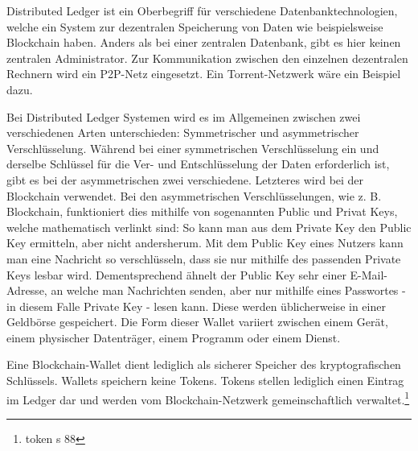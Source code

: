 Distributed Ledger ist ein Oberbegriff für verschiedene Datenbanktechnologien, welche ein System zur dezentralen Speicherung von Daten wie beispielsweise Blockchain haben. 
Anders als bei einer zentralen Datenbank, gibt es hier keinen zentralen Administrator. 
Zur Kommunikation zwischen den einzelnen dezentralen Rechnern wird ein P2P-Netz eingesetzt. 
Ein Torrent-Netzwerk wäre ein Beispiel dazu.

Bei Distributed Ledger Systemen wird es im Allgemeinen zwischen zwei verschiedenen Arten unterschieden: Symmetrischer und asymmetrischer Verschlüsselung. 
Während bei einer symmetrischen Verschlüsselung ein und derselbe Schlüssel für die Ver- und Entschlüsselung der Daten erforderlich ist, gibt es bei der asymmetrischen zwei verschiedene. 
Letzteres wird bei der Blockchain verwendet. 
Bei den asymmetrischen Verschlüsselungen, wie z. B. Blockchain, funktioniert dies mithilfe von sogenannten Public und Privat Keys, welche mathematisch verlinkt sind: So kann man aus dem Private Key den Public Key ermitteln, aber nicht andersherum. 
Mit dem Public Key eines Nutzers kann man eine Nachricht so verschlüsseln, dass sie nur mithilfe des passenden Private Keys lesbar wird. 
Dementsprechend ähnelt der Public Key sehr einer E-Mail-Adresse, an welche man Nachrichten senden, aber nur mithilfe eines Passwortes - in diesem Falle Private Key - lesen kann. Diese werden üblicherweise in einer Geldbörse gespeichert. 
Die Form dieser Wallet variiert zwischen einem Gerät, einem physischer Datenträger, einem Programm oder einem Dienst.

Eine Blockchain-Wallet dient lediglich als sicherer Speicher des kryptografischen Schlüssels. 
Wallets speichern keine Tokens. 
Tokens stellen lediglich einen Eintrag im Ledger dar und werden vom Blockchain-Netzwerk gemeinschaftlich verwaltet.\footnote{token s 88}


